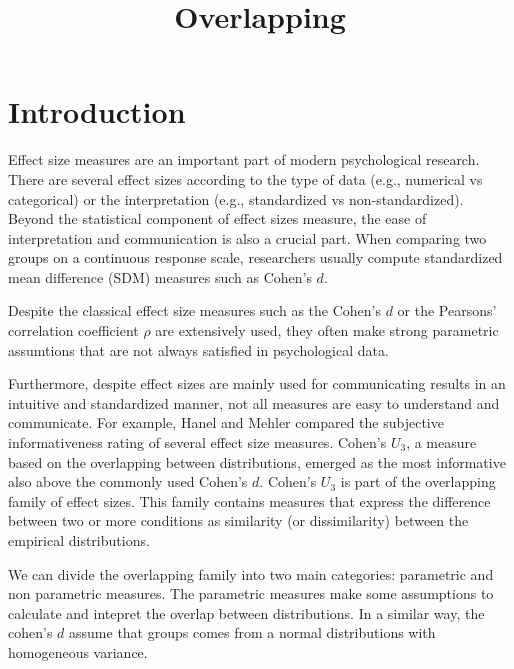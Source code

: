 \documentclass[man]{apa7}
\title{Overlapping}
\begin{document}
\maketitle

\section{Introduction}

Effect size measures are an important part of modern psychological research. There are several effect sizes according to the type of data (e.g., numerical vs categorical) or the interpretation (e.g., standardized vs non-standardized). Beyond the statistical component of effect sizes measure, the ease of interpretation and communication is also a crucial part. When comparing two groups on a continuous response scale, researchers usually compute standardized mean difference (SDM) measures such as Cohen's $d$.

Despite the classical effect size measures such as the Cohen's $d$ or the Pearsons' correlation coefficient $\rho$ are extensively used, they often make strong parametric assumtions that are not always satisfied in psychological data.


Furthermore, despite effect sizes are mainly used for communicating results in an intuitive and standardized manner, not all measures are easy to understand and communicate. For example, Hanel and Mehler \cite{Hanel2019-hb} compared the subjective informativeness rating of several effect size measures. Cohen's $U_3$, a measure based on the overlapping between distributions, emerged as the most informative also above the commonly used Cohen's $d$. Cohen's $U_3$ is part of the overlapping family of effect sizes. This family contains measures that express the difference between two or more conditions as similarity (or dissimilarity) between the empirical distributions.


We can divide the overlapping family into two main categories: parametric and non parametric measures. The parametric measures make some assumptions to calculate and intepret the overlap between distributions. In a similar way, the cohen's $d$ assume that groups comes from a normal distributions with homogeneous variance.
\end{document}
